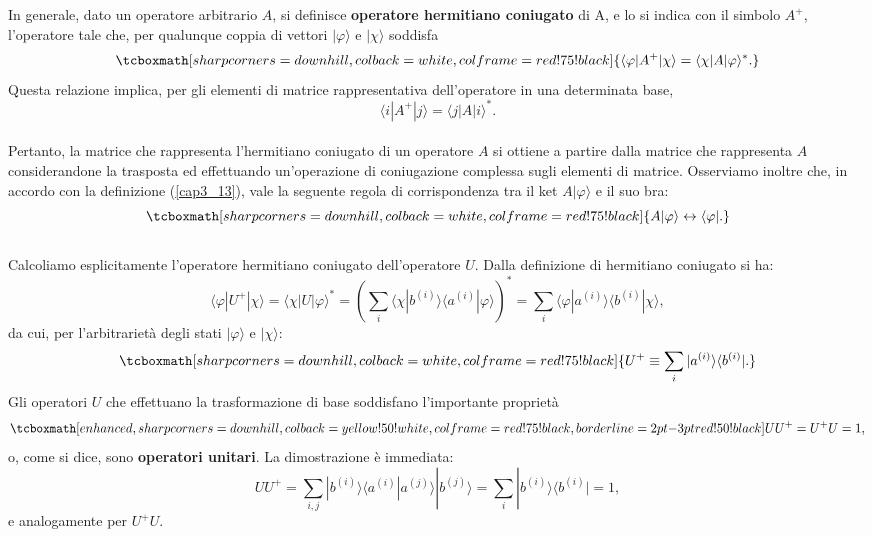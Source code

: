 \documentclass[a4paper,12pt,oneside]{book}
\begin{document}
In generale, dato un operatore arbitrario $A$, si definisce \textbf{operatore hermitiano coniugato} di A, e lo si indica con il simbolo $A^+$, l'operatore tale che, per qualunque coppia di vettori $| \varphi \rangle$ e $ | \chi \rangle $ soddisfa
	\begin{equation}
		\tcboxmath[sharp corners=downhill ,colback=white,colframe=red!75!black]{
			\langle \varphi | A^{+} | \chi \rangle = \langle \chi | A | \varphi \rangle ^* .
			}
	\label{cap3_13}
	\end{equation}
Questa relazione implica, per gli elementi di matrice rappresentativa dell'operatore in una determinata base,
	\begin{equation}
		\langle i | A^{+} | j \rangle = \langle j | A | i \rangle ^* .
	\end{equation}\\

Pertanto, la matrice che rappresenta l'hermitiano coniugato di un operatore $A$ si ottiene a partire dalla matrice che rappresenta $A$ considerandone la trasposta ed effettuando un'operazione di coniugazione complessa sugli elementi di matrice. Osserviamo inoltre che, in accordo con la definizione (\ref{cap3_13}), vale la seguente regola di corrispondenza tra il ket $A| \varphi \rangle$ e il suo bra:
	\begin{equation}
		\tcboxmath[sharp corners=downhill ,colback=white,colframe=red!75!black]{
			A| \varphi \rangle \leftrightarrow \langle \varphi | .
			}
	\end{equation}\\

Calcoliamo esplicitamente l'operatore hermitiano coniugato dell'operatore $U$. Dalla definizione di hermitiano coniugato si ha:
	\begin{equation}
		\langle \varphi | U^{+} | \chi \rangle = \langle \chi | U | \varphi \rangle ^* =  \left( \sum \limits_{i} \langle \chi | b^{(i)} \rangle \langle a^{(i)} | \varphi \rangle \right)^* =\sum \limits_{i} \langle \varphi | a^{(i)}\rangle \langle b^{(i)} | \chi \rangle ,
	\end{equation}
da cui, per l'arbitrarietà degli stati $| \varphi \rangle $ e $| \chi \rangle $:
	\begin{equation}
		\tcboxmath[sharp corners=downhill ,colback=white,colframe=red!75!black]{
			U^+ \equiv \sum \limits_{i} | a^{(i)} \rangle \langle b^{(i)} |  .
			}
	\end{equation}
Gli operatori $U$ che effettuano la trasformazione di base soddisfano l'importante proprietà
	\begin{equation}
		\tcboxmath[enhanced,sharp corners=downhill ,colback=yellow!50!white,colframe=red!75!black, borderline={2pt}{-3pt}{red!50!black}]{
			UU^+= U^+U=1 ,
			}
	\end{equation}
o, come si dice, sono \textbf{operatori unitari}. La dimostrazione è immediata:
	\begin{equation}
		UU^+ = \sum\limits_{i,j}  | b^{(i)} \rangle \langle a^{(i)} | a^{(j)} \rangle | b^{(j)} \rangle = 
\sum\limits_{i} | b^{(i)} \rangle \langle b^{(i)} | = 1 ,
	\end{equation}
e analogamente per $U^+U$.\\
\end{document}
